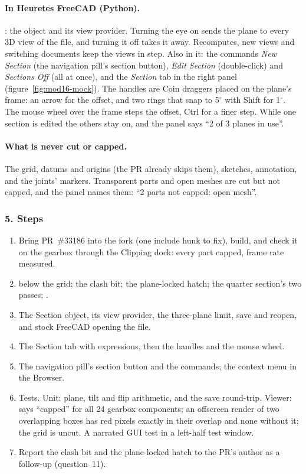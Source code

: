 \paragraph{In Heuretes FreeCAD (Python).} : the object and its view provider. Turning the eye on
sends the plane to every 3D view of the file, and turning it off takes it away. Recomputes, new views and switching
documents keep the views in step. Also in it: the commands \emph{New Section} (the navigation pill's section
button), \emph{Edit Section} (double-click) and \emph{Sections Off} (all at once), and the \emph{Section} tab in the
right panel (figure~\ref{fig:mod16-mock}). The handles are Coin draggers placed on the plane's frame: an arrow for
the offset, and two rings that snap to 5$^\circ$ with Shift for 1$^\circ$. The mouse wheel over the frame steps the
offset, Ctrl for a finer step. While one section is edited the others stay on, and the panel says
``2 of 3 planes in use''.

\paragraph{What is never cut or capped.} The grid, datums and origins (the PR already skips them), sketches,
annotation, and the joints' markers. Transparent parts and open meshes are cut but not capped, and the panel names
them: ``2 parts not capped: open mesh''.

\subsubsection*{5. Steps}

\begin{enumerate}[nosep]
  \item Bring PR~\#33186 into the fork (one include hunk to fix), build, and check it on the gearbox through the
        Clipping dock: every part capped, frame rate measured.
  \item {} below the grid; the clash bit; the plane-locked hatch; the quarter section's two
        passes; .
  \item The Section object, its view provider, the three-plane limit, save and reopen, and stock FreeCAD opening the
        file.
  \item The Section tab with expressions, then the handles and the mouse wheel.
  \item The navigation pill's section button and the commands; the context menu in the Browser.
  \item Tests. Unit: plane, tilt and flip arithmetic, and the save round-trip. Viewer:  says
        ``capped'' for all 24 gearbox components; an offscreen render of two overlapping boxes has red pixels exactly
        in their overlap and none without it; the grid is uncut. A narrated GUI test in a left-half test window.
  \item Report the clash bit and the plane-locked hatch to the PR's author as a follow-up (question~11).
\end{enumerate}

